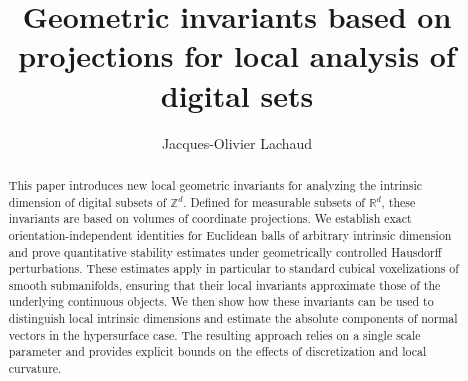 \documentclass[runningheads]{llncs}
\newcommand{\Alert}[1]{{\color{red}{#1}}}
\newcommand{\R}{\mathbb{R}}
\begin{document}
\title{Geometric invariants based on projections for local analysis of digital sets}

\author{Jacques-Olivier Lachaud}




\maketitle              %
%
\begin{abstract}
  This paper introduces new local geometric invariants for analyzing
  the intrinsic dimension of digital subsets of
  $\mathbb{Z}^d$. Defined for measurable subsets of $\mathbb{R}^d$,
  these invariants are based on volumes of coordinate projections. We
  establish exact orientation-independent identities for Euclidean
  balls of arbitrary intrinsic dimension and prove quantitative
  stability estimates under geometrically controlled Hausdorff
  perturbations. These estimates apply in particular to standard
  cubical voxelizations of smooth submanifolds, ensuring that their
  local invariants approximate those of the underlying continuous
  objects. We then show how these invariants can be used to
  distinguish local intrinsic dimensions and estimate the absolute
  components of normal vectors in the hypersurface case. The resulting
  approach relies on a single scale parameter and provides explicit
  bounds on the effects of discretization and local curvature.
  
\end{abstract}
\end{document}
